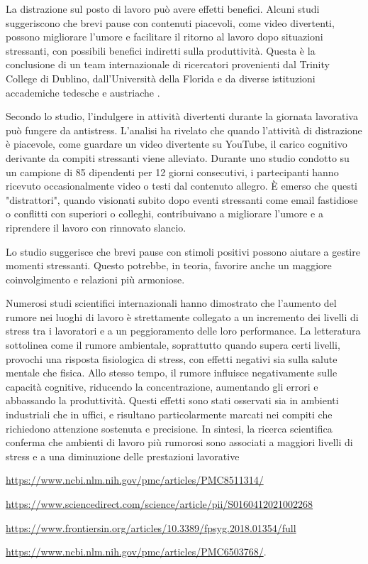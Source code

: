 \documentclass[12pt]{book} %
\begin{document}
\begin{mdframed}[linewidth=1pt]
La distrazione sul posto di lavoro può avere effetti benefici. Alcuni studi suggeriscono che brevi pause con contenuti piacevoli, come video divertenti, possono migliorare l’umore e facilitare il ritorno al lavoro dopo situazioni stressanti, con possibili benefici indiretti sulla produttività. Questa è la conclusione di un team internazionale di ricercatori provenienti dal Trinity College di Dublino, dall'Università della Florida e da diverse istituzioni accademiche tedesche e austriache .

Secondo lo studio, l'indulgere in attività divertenti durante la giornata lavorativa può fungere da antistress. L'analisi ha rivelato che quando l'attività di distrazione è piacevole, come guardare un video divertente su YouTube, il carico cognitivo derivante da compiti stressanti viene alleviato. Durante uno studio condotto su un campione di 85 dipendenti per 12 giorni consecutivi, i partecipanti hanno ricevuto occasionalmente video o testi dal contenuto allegro. È emerso che questi "distrattori", quando visionati subito dopo eventi stressanti come email fastidiose o conflitti con superiori o colleghi, contribuivano a migliorare l'umore e a riprendere il lavoro con rinnovato slancio.

Lo studio suggerisce che brevi pause con stimoli positivi possono aiutare a gestire momenti stressanti. Questo potrebbe, in teoria, favorire anche un maggiore coinvolgimento e relazioni più armoniose.

Numerosi studi scientifici internazionali hanno dimostrato che l’aumento del rumore nei luoghi di lavoro è strettamente collegato a un incremento dei livelli di stress tra i lavoratori e a un peggioramento delle loro performance. La letteratura sottolinea come il rumore ambientale, soprattutto quando supera certi livelli, provochi una risposta fisiologica di stress, con effetti negativi sia sulla salute mentale che fisica. Allo stesso tempo, il rumore influisce negativamente sulle capacità cognitive, riducendo la concentrazione, aumentando gli errori e abbassando la produttività. Questi effetti sono stati osservati sia in ambienti industriali che in uffici, e risultano particolarmente marcati nei compiti che richiedono attenzione sostenuta e precisione. In sintesi, la ricerca scientifica conferma che ambienti di lavoro più rumorosi sono associati a maggiori livelli di stress e a una diminuzione delle prestazioni lavorative \raggedright\url{https://www.ncbi.nlm.nih.gov/pmc/articles/PMC8511314/} \raggedright\url{https://www.sciencedirect.com/science/article/pii/S0160412021002268} \raggedright\url{https://www.frontiersin.org/articles/10.3389/fpsyg.2018.01354/full} \raggedright\url{https://www.ncbi.nlm.nih.gov/pmc/articles/PMC6503768/}.
\end{mdframed}
\end{document}
